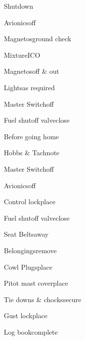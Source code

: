 \begin{multicols}{2}
\begin{checklist}{Shutdown}
    \item{Avionics}{off}
    \item{Magnetos}{ground check}
    \item{Mixture}{ICO}
    \item{Magnetos}{off \& out}
    \item{Lights}{as required}
    \item{Master Switch}{off}
    \item{Fuel shutoff valve}{close}
\end{checklist}

\begin{checklist}{Before going home}
    \item{Hobbs \& Tach}{note}
    \item{Master Switch}{off}
    \item{Avionics}{off}
    \item{Control lock}{place}
    \item{Fuel shutoff valve}{close}
    \item{Seat Belts}{away}
    \item{Belongings}{remove}
    \item{Cowl Plugs}{place}
    \item{Pitot mast cover}{place}
    \item{Tie downs \& chocks}{secure}
    \item{Gust lock}{place}
    \item{Log book}{complete}
\end{checklist}
\end{multicols}

